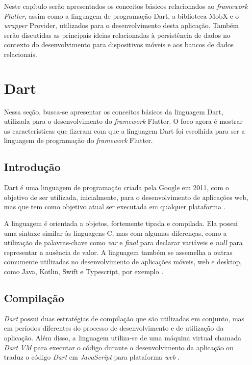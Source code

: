 
\label{Cap:Teoria}

Neste capítulo serão apresentados os conceitos básicos relacionados ao \textit{framework Flutter}, assim como a linguagem de programação Dart, a biblioteca MobX e o \textit{wrapper} Provider, utilizados para o desenvolvimento desta aplicação. Também serão discutidas as principais ideias relacionadas à persistência de dados no contexto do desenvolvimento para dispositivos móveis e aos bancos de dados relacionais.

\section{Dart}
\label{cap2:Sec:Dart}

Nessa seção, busca-se apresentar os conceitos básicos da linguagem Dart, utilizada para o desenvolvimento do \textit{framework} Flutter. O foco agora é mostrar as características que fizeram com que a linguagem Dart foi escolhida para ser a linguagem de programação do \textit{framework} Flutter.

\subsection{Introdução}
\label{cap2:SubSec:Introducao}

Dart \cite{dart} é uma linguagem de programação criada pela Google em 2011, com o objetivo de ser utilizada, inicialmente, para o desenvolvimento de aplicações web, mas que tem como objetivo atual ser executada em qualquer plataforma \cite{bak2011dart} \cite{dart-platforms}.

A linguagem é orientada a objetos, fortemente tipada e compilada. Ela possui uma sintaxe similar às linguagens C, mas com algumas diferenças, como a utilização de palavras-chave como \textit{var} e \textit{final} para declarar variáveis e \textit{null} para representar a ausência de valor. A linguagem também se assemelha a outras comumente utilizadas no desenvolvimento de aplicações móveis, web e desktop, como Java, Kotlin, Swift e Typescript, por exemplo \cite{dart} \cite{dart-language}.


\subsection{Compilação}
\label{cap2:SubSec:Compilacao}
\textit{Dart} possui duas estratégias de compilação que são utilizadas em conjunto, mas em períodos diferentes do processo de desenvolvimento e de utilização da aplicação. Além disso, a linguagem utiliza-se de uma máquina virtual chamada \textit{Dart VM} para executar o código durante o desenvolvimento da aplicação ou traduz o código \textit{Dart} em \textit{JavaScript} para plataforma \textit{web} \cite{dart-platforms}.

